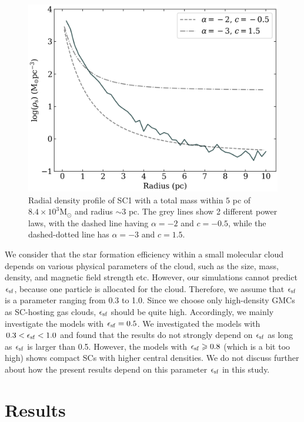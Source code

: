 \documentclass[fleqn,usenatbib]{mnras}
\begin{document}
\begin{figure}
 \includegraphics[width=\columnwidth]{7_more_labels_T=0.423006_radial_density_profile.png}
 \caption{Radial density profile of SC1 with a total mass within $5$ pc of $8.4\times 10^3 \text{M}_\odot$ and radius ${\sim}3$ pc. The grey lines show 2 different power laws, with the dashed line having $\alpha =-2$ and $c=-0.5$, while the dashed-dotted line has $\alpha=-3$ and $c=1.5$.}
 \label{fig:7RadDense}
\end{figure}
We consider that the star formation efficiency within a small molecular cloud
depends on various physical parameters of the cloud, such as the size,
mass, density, and magnetic field strength etc. However, our simulations
cannot predict $\epsilon_{\rm sf}$, because one particle is allocated 
for the cloud. Therefore, we assume that $\epsilon_{\rm sf}$ is a
parameter ranging from 0.3 to 1.0. Since we choose only high-density GMCs
as SC-hosting gas clouds,  $\epsilon_{\rm sf}$ should be quite high.
Accordingly, we mainly investigate the models with $\epsilon_{\rm sf}=0.5$. We investigated the models with $0.3<\epsilon_{\rm sf}< 1.0$ and found that
the results do not strongly depend on $\epsilon_{\rm sf}$ as long as $\epsilon_{\rm sf}$ is larger than
0.5. However, the models with $\epsilon_{\rm sf}\geq 0.8$ (which is a bit too high) shows compact SCs with higher central densities. We do not discuss further about how the present results depend on this parameter $\epsilon_{\rm sf}$ in this study.


\section{Results}
\label{sec:results}
\end{document}

